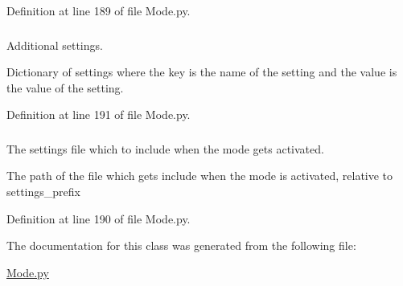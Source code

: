 Definition at line 189 of file Mode.py.

\hypertarget{class_mode_1_1_mode_af4bebfeddda24f7437fc086bc52ca711}{
\subsubsection[{settings}]{}}
\label{class_mode_1_1_mode_af4bebfeddda24f7437fc086bc52ca711}


Additional settings. 

Dictionary of settings where the key is the name of the setting and the value is the value of the setting. 

Definition at line 191 of file Mode.py.

\hypertarget{class_mode_1_1_mode_a40402dcfd634686dcd9b2ce8b8f3d4eb}{
\subsubsection[{settings\_\-file}]{}}
\label{class_mode_1_1_mode_a40402dcfd634686dcd9b2ce8b8f3d4eb}


The settings file which to include when the mode gets activated. 

The path of the file which gets include when the mode is activated, relative to settings\_\-prefix 

Definition at line 190 of file Mode.py.



The documentation for this class was generated from the following file:\begin{DoxyCompactItemize}
\item 
\hyperlink{_mode_8py}{Mode.py}\end{DoxyCompactItemize}
